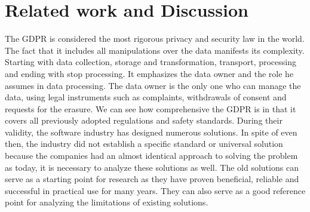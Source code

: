 \documentclass[11pt,english]{article}
\begin{document}
\section{Related work and Discussion}
The GDPR is considered the most rigorous privacy and security law in the world. The fact that it includes all manipulations over the data manifests its complexity. Starting with data collection, storage and transformation, transport, processing and ending with stop processing. It emphasizes the data owner and the role he assumes in data processing. The data owner is the only one who can manage the data, using legal instruments such as complaints, withdrawals of consent and requests for the erasure. We can see how comprehensive the GDPR is in that it covers all previously adopted regulations and safety standards. During their validity, the software industry has designed numerous solutions. In spite of even then, the industry did not establish a specific standard or universal solution because the companies had an almost identical approach to solving the problem as today, it is necessary to analyze these solutions as well. The old solutions can serve as a starting point for research as they have proven beneficial, reliable and successful in practical use for many years. They can also serve as a good reference point for analyzing the limitations of existing solutions.
\end{document}
